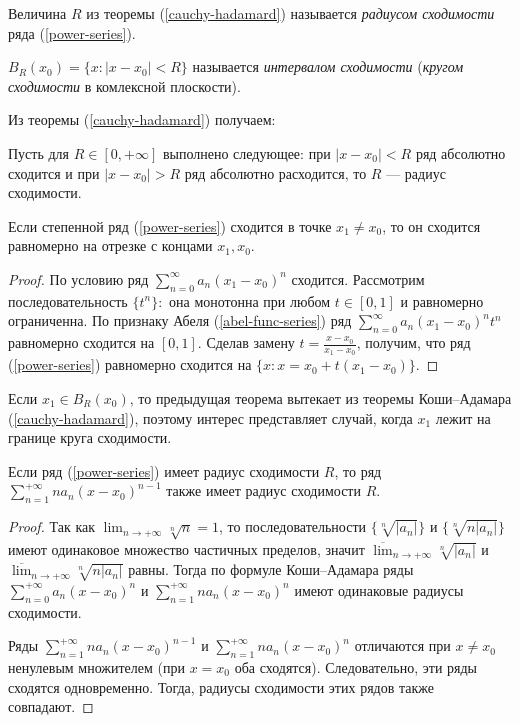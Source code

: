 \begin{definition}
    Величина $R$ из теоремы (\ref{cauchy-hadamard}) называется \emph{радиусом сходимости} ряда (\ref{power-series}).

    $B_R(x_0) = \{x: |x - x_0| < R\}$ называется \emph{интервалом сходимости} (\emph{кругом сходимости} в комлексной плоскости).
\end{definition}

Из теоремы (\ref{cauchy-hadamard}) получаем:
\begin{corollary}
    Пусть для $R \in [0, +\infty]$ выполнено следующее: при $|x - x_0| < R$ ряд абсолютно сходится и при $|x - x_0| > R$ ряд абсолютно расходится, то $R$ --- радиус сходимости. 
\end{corollary}

\begin{theorem}[Абель]
    \label{abel-power-series}
    Если степенной ряд (\ref{power-series}) сходится в точке $x_{1} \neq x_{0}$, то он сходится равномерно на отрезке с концами $x_{1}, x_{0}$.
\end{theorem}

\begin{proof}
    По условию ряд $\sum_{n = 0}^\infty a_n (x_1 - x_0)^n$ сходится. Рассмотрим последовательность $\{t^{n}\}:$ она монотонна при любом $t \in [0, 1]$ и равномерно ограниченна. По признаку Абеля (\ref{abel-func-series}) ряд $\sum_{n = 0}^\infty a_n (x_1 - x_0)^n t^{n}$ равномерно сходится на $[0, 1]$. Сделав замену $t = \frac{x - x_{0}}{x_{1} - x_{0}}$, получим, что ряд (\ref{power-series}) равномерно сходится на $\{x: x = x_{0} + t(x_{1} - x_{0})\}$.
\end{proof}

\begin{note}
    Если $x_{1} \in B_{R}(x_{0})$, то предыдущая теорема вытекает из теоремы Коши--Адамара (\ref{cauchy-hadamard}), поэтому интерес представляет случай, когда $x_{1}$ лежит на границе круга сходимости.
\end{note}

\begin{lemma}
    \label{lem1-power-series}
    Если ряд (\ref{power-series}) имеет радиус сходимости $R$, то ряд $\sum_{n = 1}^{+\infty}n a_{n}(x - x_{0})^{n - 1}$ также имеет радиус сходимости $R$.
\end{lemma}

\begin{proof}
    Так как $\lim_{n \to +\infty} \sqrt[n]{n} = 1$, то последовательности $\{\sqrt[n]{|a_{n}|}\}$ и $\{\sqrt[n]{n|a_{n}|}\}$ имеют одинаковое множество частичных пределов, значит $\overline{\lim}_{n \to +\infty} \sqrt[n]{|a_{n}|}$ и $\overline{\lim}_{n \to +\infty} \sqrt[n]{n |a_{n}|}$ равны. Тогда по формуле Коши--Адамара ряды $\sum_{n = 0}^{+\infty} a_{n}(x - x_{0})^{n}$ и $\sum_{n = 1}^{+\infty}n a_{n}(x - x_{0})^{n}$ имеют одинаковые радиусы сходимости.

    Ряды $\sum_{n = 1}^{+\infty}n a_{n}(x - x_{0})^{n - 1}$ и $\sum_{n = 1}^{+\infty}n a_{n}(x - x_{0})^{n}$ отличаются при $x \neq x_{0}$ ненулевым множителем (при $x = x_{0}$ оба сходятся). Следовательно, эти ряды сходятся одновременно. Тогда, радиусы сходимости этих рядов также совпадают.
\end{proof}

